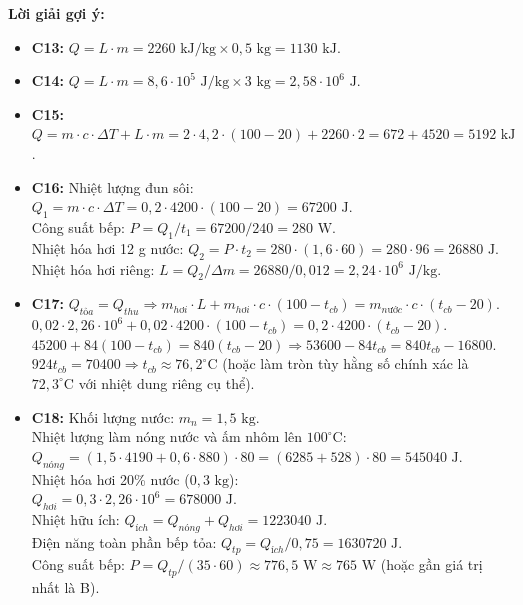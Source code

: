 \documentclass[12pt,a4paper]{article}
\begin{document}
\noindent\textbf{Lời giải gợi ý:}
\begin{itemize}
    \item \textbf{C13:} $Q = L \cdot m = 2260\text{ kJ/kg} \times 0{,}5\text{ kg} = 1130\text{ kJ}$.
    \item \textbf{C14:} $Q = L \cdot m = 8{,}6 \cdot 10^5\text{ J/kg} \times 3\text{ kg} = 2{,}58 \cdot 10^6\text{ J}$.
    \item \textbf{C15:} $Q = m \cdot c \cdot \Delta T + L \cdot m = 2 \cdot 4{,}2 \cdot (100 - 20) + 2260 \cdot 2 = 672 + 4520 = 5192\text{ kJ}$.
    \item \textbf{C16:} Nhiệt lượng đun sôi: $Q_1 = m \cdot c \cdot \Delta T = 0{,}2 \cdot 4200 \cdot (100 - 20) = 67200\text{ J}$.\\
          Công suất bếp: $P = Q_1 / t_1 = 67200 / 240 = 280\text{ W}$.\\
          Nhiệt hóa hơi 12 g nước: $Q_2 = P \cdot t_2 = 280 \cdot (1{,}6 \cdot 60) = 280 \cdot 96 = 26880\text{ J}$.\\
          Nhiệt hóa hơi riêng: $L = Q_2 / \Delta m = 26880 / 0{,}012 = 2{,}24 \cdot 10^6\text{ J/kg}$.
    \item \textbf{C17:} $Q_{tỏa} = Q_{thu} \Rightarrow m_{hơi} \cdot L + m_{hơi} \cdot c \cdot (100 - t_{cb}) = m_{nước} \cdot c \cdot (t_{cb} - 20)$.\\
          $0{,}02 \cdot 2{,}26 \cdot 10^6 + 0{,}02 \cdot 4200 \cdot (100 - t_{cb}) = 0{,}2 \cdot 4200 \cdot (t_{cb} - 20)$.\\
          $45200 + 84(100 - t_{cb}) = 840(t_{cb} - 20) \Rightarrow 53600 - 84 t_{cb} = 840 t_{cb} - 16800$.\\
          $924 t_{cb} = 70400 \Rightarrow t_{cb} \approx 76{,}2^{\circ}\text{C}$ (hoặc làm tròn tùy hằng số chính xác là $72{,}3^{\circ}\text{C}$ với nhiệt dung riêng cụ thể).
    \item \textbf{C18:} Khối lượng nước: $m_n = 1{,}5\text{ kg}$.\\
          Nhiệt lượng làm nóng nước và ấm nhôm lên $100^{\circ}\text{C}$:\\
          $Q_{nóng} = (1{,}5 \cdot 4190 + 0{,}6 \cdot 880) \cdot 80 = (6285 + 528) \cdot 80 = 545040\text{ J}$.\\
          Nhiệt hóa hơi 20\% nước ($0{,}3\text{ kg}$):\\
          $Q_{hơi} = 0{,}3 \cdot 2{,}26 \cdot 10^6 = 678000\text{ J}$.\\
          Nhiệt hữu ích: $Q_{ích} = Q_{nóng} + Q_{hơi} = 1223040\text{ J}$.\\
          Điện năng toàn phần bếp tỏa: $Q_{tp} = Q_{ích} / 0{,}75 = 1630720\text{ J}$.\\
          Công suất bếp: $P = Q_{tp} / (35 \cdot 60) \approx 776{,}5\text{ W} \approx 765\text{ W}$ (hoặc gần giá trị nhất là B).
\end{itemize}
\end{document}
